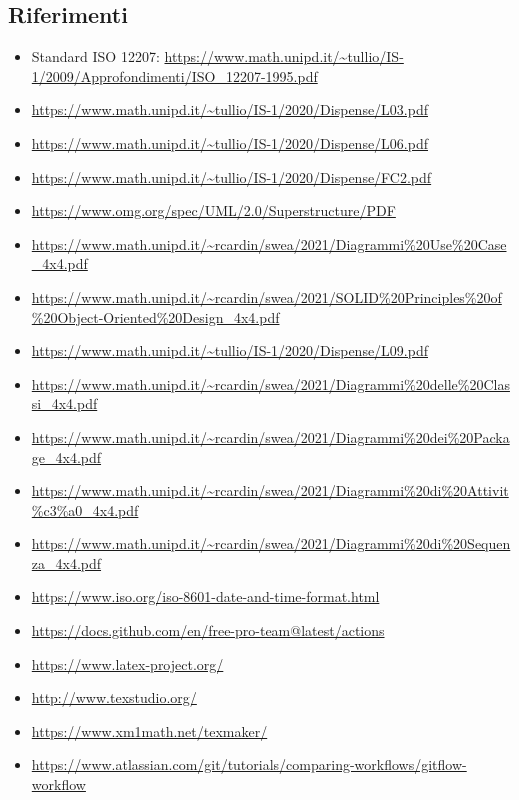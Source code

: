 \subsection{Riferimenti}
\label{ref}
        \begin{itemize}
            \item Standard ISO 12207:  \url{https://www.math.unipd.it/~tullio/IS-1/2009/Approfondimenti/ISO_12207-1995.pdf}
            \item \url{https://www.math.unipd.it/~tullio/IS-1/2020/Dispense/L03.pdf}
            \item \url{https://www.math.unipd.it/~tullio/IS-1/2020/Dispense/L06.pdf}
            \item \url{https://www.math.unipd.it/~tullio/IS-1/2020/Dispense/FC2.pdf}
            \item \url{https://www.omg.org/spec/UML/2.0/Superstructure/PDF}
            \item \url{https://www.math.unipd.it/~rcardin/swea/2021/Diagrammi\%20Use\%20Case_4x4.pdf}
            \item \url{https://www.math.unipd.it/~rcardin/swea/2021/SOLID\%20Principles\%20of\%20Object-Oriented\%20Design_4x4.pdf}
            \item \url{https://www.math.unipd.it/~tullio/IS-1/2020/Dispense/L09.pdf}
            \item \url{https://www.math.unipd.it/~rcardin/swea/2021/Diagrammi\%20delle\%20Classi_4x4.pdf}
            \item \url{https://www.math.unipd.it/~rcardin/swea/2021/Diagrammi\%20dei\%20Package_4x4.pdf}
            \item \url{https://www.math.unipd.it/~rcardin/swea/2021/Diagrammi\%20di\%20Attivit\%c3\%a0_4x4.pdf}
            \item \url{https://www.math.unipd.it/~rcardin/swea/2021/Diagrammi\%20di\%20Sequenza_4x4.pdf}
            \item \url{https://www.iso.org/iso-8601-date-and-time-format.html}
            \item \url{https://docs.github.com/en/free-pro-team@latest/actions}
            \item \url{https://www.latex-project.org/}
            \item \url{http://www.texstudio.org/}
            \item \url{https://www.xm1math.net/texmaker/}
            \item \url{https://www.atlassian.com/git/tutorials/comparing-workflows/gitflow-workflow}

        \end{itemize}

\pagebreak